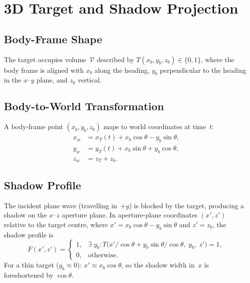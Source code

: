 \documentclass[11pt,a4paper]{article}
\begin{document}
\section{3D Target and Shadow Projection}
\label{sec:shadow}

\subsection{Body-Frame Shape}

The target occupies volume~$\mathcal{V}$ described by
$T(x_b,y_b,z_b)\in\{0,1\}$, where the body frame is aligned with
$x_b$ along the heading, $y_b$ perpendicular to the heading in the
$x$--$y$ plane, and $z_b$ vertical.

\subsection{Body-to-World Transformation}

A body-frame point $(x_b,y_b,z_b)$ maps to world coordinates at
time~$t$:
\begin{align}
  x_w &= x_T(t) + x_b\cos\theta - y_b\sin\theta,
  \label{eq:xw}\\
  y_w &= y_T(t) + x_b\sin\theta + y_b\cos\theta,
  \label{eq:yw}\\
  z_w &= z_T + z_b.
  \label{eq:zw}
\end{align}

\subsection{Shadow Profile}
\label{sec:shadow_profile}

The incident plane wave (travelling in~$+y$) is blocked by the
target, producing a shadow on the $x$--$z$ aperture plane.  In
aperture-plane coordinates $(x',z')$ relative to the target centre,
where $x'=x_b\cos\theta-y_b\sin\theta$ and $z'=z_b$, the shadow
profile is
\begin{equation}
  F(x',z') =
  \begin{cases}
    1, & \exists\;y_b: T\!\bigl(x'/\cos\theta
    + y_b\sin\theta/\cos\theta,\;y_b,\;z'\bigr)=1,\\
    0, & \text{otherwise}.
  \end{cases}
  \label{eq:shadow_profile}
\end{equation}
For a thin target ($y_b\approx 0$): $x'\approx x_b\cos\theta$, so
the shadow width in~$x$ is foreshortened by $\cos\theta$.
\end{document}
